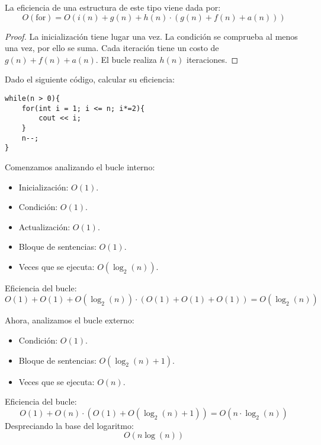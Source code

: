 La eficiencia de una estructura de este tipo viene dada por:
\begin{equation*}
O(\text{for}) = O(i(n)+g(n) + h(n) \cdot (g(n)+f(n)+a(n)))
\end{equation*}

\begin{proof}
La inicialización tiene lugar una vez.
La condición se comprueba al menos una vez, por ello se suma.  
Cada iteración tiene un costo de $g(n) + f(n) + a(n)$.  
El bucle realiza $h(n)$ iteraciones.
\end{proof}

\begin{ejemplo}
Dado el siguiente código, calcular su eficiencia:
\begin{listing}[H]
\begin{verbatim}
while(n > 0){
    for(int i = 1; i <= n; i*=2){
        cout << i;
    }
    n--;
}
\end{verbatim}
\end{listing}
Comenzamos analizando el bucle interno:
\begin{itemize}
\item Inicialización: $O(1)$.
\item Condición: $O(1)$.
\item Actualización: $O(1)$.
\item Bloque de sentencias: $O(1)$.
\item Veces que se ejecuta: $O(\log_2(n))$.
\end{itemize}
  
Eficiencia del bucle:
\begin{equation*}
O(1)+O(1)+O(\log_2(n))\cdot (O(1)+O(1)+O(1)) = O(\log_2(n))
\end{equation*}
  
Ahora, analizamos el bucle externo:
\begin{itemize}
\item Condición: $O(1)$.
\item Bloque de sentencias: $O(\log_2(n)+1)$.
\item Veces que se ejecuta: $O(n)$.
\end{itemize}
  
Eficiencia del bucle:
\begin{equation*}
O(1)+O(n)\cdot (O(1)+O(\log_2(n)+1)) = O(n\cdot \log_2(n))
\end{equation*}
Despreciando la base del logaritmo:
\begin{equation*}
O(n\log(n))
\end{equation*}
\end{ejemplo}

